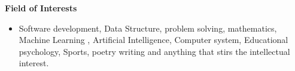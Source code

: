 \documentclass[legalpaper,10pt]{article}
\newcommand{\resheading}[1]{{\large \colorbox{mygrey}{\begin{minipage}{\textwidth}{\textbf{#1 \vphantom{p\^{E}}}}\end{minipage}}}}
\begin{document}
	\vspace{0.20in}
	
	\resheading{Field of Interests}
            \vspace{0.10in}
		\begin{itemize}
			\item Software development, Data Structure, problem solving,  mathematics, Machine Learning , Artificial Intelligence, Computer system, Educational psychology, Sports, poetry writing and anything that stirs the intellectual interest.
		\end{itemize}
\end{document}
